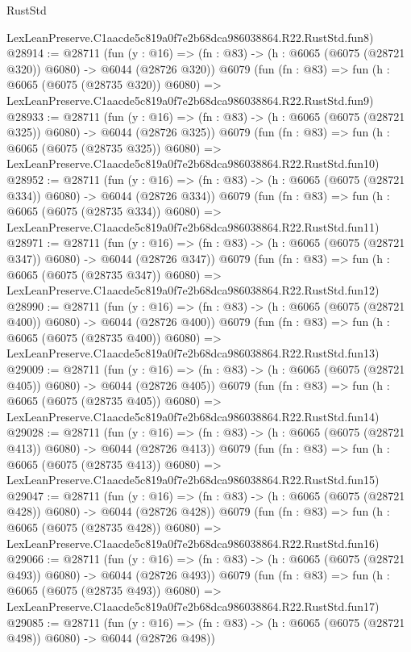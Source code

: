 \begin{lexlean}{RustStd}
\begin{coremodule}
    LexLeanPreserve.C1aacde5c819a0f7e2b68dca986038864.R22.RustStd.fun8)
@28914 := @28711
    (fun (y : @16) => (fn : @83) -> (h : @6065 (@6075 (@28721 @320)) @6080) -> @6044 (@28726 @320))
    @6079
    (fun (fn : @83) =>
    fun (h : @6065 (@6075 (@28735 @320)) @6080) =>
    LexLeanPreserve.C1aacde5c819a0f7e2b68dca986038864.R22.RustStd.fun9)
@28933 := @28711
    (fun (y : @16) => (fn : @83) -> (h : @6065 (@6075 (@28721 @325)) @6080) -> @6044 (@28726 @325))
    @6079
    (fun (fn : @83) =>
    fun (h : @6065 (@6075 (@28735 @325)) @6080) =>
    LexLeanPreserve.C1aacde5c819a0f7e2b68dca986038864.R22.RustStd.fun10)
@28952 := @28711
    (fun (y : @16) => (fn : @83) -> (h : @6065 (@6075 (@28721 @334)) @6080) -> @6044 (@28726 @334))
    @6079
    (fun (fn : @83) =>
    fun (h : @6065 (@6075 (@28735 @334)) @6080) =>
    LexLeanPreserve.C1aacde5c819a0f7e2b68dca986038864.R22.RustStd.fun11)
@28971 := @28711
    (fun (y : @16) => (fn : @83) -> (h : @6065 (@6075 (@28721 @347)) @6080) -> @6044 (@28726 @347))
    @6079
    (fun (fn : @83) =>
    fun (h : @6065 (@6075 (@28735 @347)) @6080) =>
    LexLeanPreserve.C1aacde5c819a0f7e2b68dca986038864.R22.RustStd.fun12)
@28990 := @28711
    (fun (y : @16) => (fn : @83) -> (h : @6065 (@6075 (@28721 @400)) @6080) -> @6044 (@28726 @400))
    @6079
    (fun (fn : @83) =>
    fun (h : @6065 (@6075 (@28735 @400)) @6080) =>
    LexLeanPreserve.C1aacde5c819a0f7e2b68dca986038864.R22.RustStd.fun13)
@29009 := @28711
    (fun (y : @16) => (fn : @83) -> (h : @6065 (@6075 (@28721 @405)) @6080) -> @6044 (@28726 @405))
    @6079
    (fun (fn : @83) =>
    fun (h : @6065 (@6075 (@28735 @405)) @6080) =>
    LexLeanPreserve.C1aacde5c819a0f7e2b68dca986038864.R22.RustStd.fun14)
@29028 := @28711
    (fun (y : @16) => (fn : @83) -> (h : @6065 (@6075 (@28721 @413)) @6080) -> @6044 (@28726 @413))
    @6079
    (fun (fn : @83) =>
    fun (h : @6065 (@6075 (@28735 @413)) @6080) =>
    LexLeanPreserve.C1aacde5c819a0f7e2b68dca986038864.R22.RustStd.fun15)
@29047 := @28711
    (fun (y : @16) => (fn : @83) -> (h : @6065 (@6075 (@28721 @428)) @6080) -> @6044 (@28726 @428))
    @6079
    (fun (fn : @83) =>
    fun (h : @6065 (@6075 (@28735 @428)) @6080) =>
    LexLeanPreserve.C1aacde5c819a0f7e2b68dca986038864.R22.RustStd.fun16)
@29066 := @28711
    (fun (y : @16) => (fn : @83) -> (h : @6065 (@6075 (@28721 @493)) @6080) -> @6044 (@28726 @493))
    @6079
    (fun (fn : @83) =>
    fun (h : @6065 (@6075 (@28735 @493)) @6080) =>
    LexLeanPreserve.C1aacde5c819a0f7e2b68dca986038864.R22.RustStd.fun17)
@29085 := @28711
    (fun (y : @16) => (fn : @83) -> (h : @6065 (@6075 (@28721 @498)) @6080) -> @6044 (@28726 @498))

\end{coremodule}
\end{lexlean}
